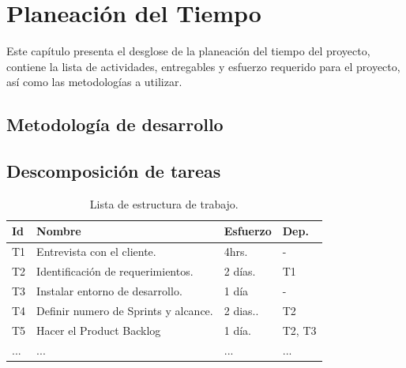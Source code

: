 \chapter{Planeación del Tiempo}	
\label{cap:tiempo}

	Este capítulo presenta el desglose de la planeación del tiempo del proyecto, contiene la lista de actividades, entregables y esfuerzo requerido para el proyecto, así como las metodologías a utilizar.

\section{Metodología de desarrollo}


\section{Descomposición de tareas}	


\begin{table}[hbtp!]
    \noindent\begin{tabular}{|p{}|p{}|p{}|p{}|}
    	\hline
    	{\bf Id} & {\bf Nombre} & {\bf Esfuerzo} & {\bf Dep.} \\
    	\hline
    	T1 & Entrevista con el cliente. & 4hrs. & - \\
    	\hline
    	T2 & Identificación de requerimientos. & 2 días. & T1 \\
    	\hline
    	T3 & Instalar entorno de desarrollo. & 1 día & - \\
    	\hline
    	T4 & Definir numero de Sprints y alcance. & 2 dias.. & T2 \\
    	\hline
    	T5 & Hacer el Product Backlog & 1 día. & T2, T3 \\
    	\hline
    	... & ... & ... & ... \\
    	\hline
    \end{tabular}
	\caption{Lista de estructura de trabajo.}
	\label{tbl:wbs}
\end{table}

